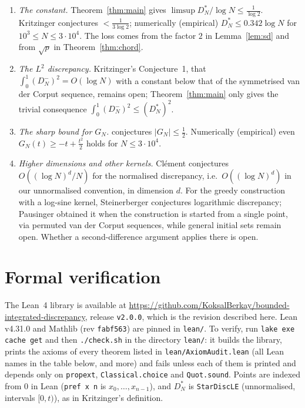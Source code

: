 \documentclass[11pt]{amsart}
\theoremstyle{remark}
\begin{document}
\begin{enumerate}
\item \emph{The constant.} Theorem~\ref{thm:main} gives
$\limsup D_N^*/\log N\le\frac1{\log2}$. Kritzinger conjectures
$<\frac1{3\log2}$; numerically (empirical) $D_N^*\le0.342\log N$ for
$10^3\le N\le3\cdot10^4$. The loss comes from the factor $2$ in Lemma~\ref{lem:sd}
and from $\sqrt p$ in Theorem~\ref{thm:chord}.
\item \emph{The $L^2$ discrepancy.} Kritzinger's Conjecture~1, that
$\int_0^1(D_N^-)^2=O(\log N)$ with a constant below that of the symmetrised van der
Corput sequence, remains open; Theorem~\ref{thm:main} only gives the trivial
consequence $\int_0^1(D_N^-)^2\le(D_N^*)^2$.
\item \emph{The sharp bound for $G_N$.} \cite{Den} conjectures
$|G_N|\le\frac12$. Numerically (empirical) even $G_N(t)\ge-t+\frac{t^2}2$ holds for
$N\le3\cdot10^4$.
\item \emph{Higher dimensions and other kernels.} Clément \cite{Cle} conjectures
$O((\log N)^d/N)$ for the normalised discrepancy, i.e.\ $O((\log N)^d)$ in our
unnormalised convention, in dimension $d$. For the greedy construction with a
log-sine kernel, Steinerberger \cite{Ste19} conjectures logarithmic discrepancy;
Pausinger \cite{Pau} obtained it when the construction is started from a single
point, via permuted van der Corput sequences, while general initial sets remain open.
Whether a second-difference argument applies there is open.
\end{enumerate}

\section{Formal verification}\label{sec:lean}

The Lean~4 library is available at
\url{https://github.com/KoksalBerkay/bounded-integrated-discrepancy}, release
\texttt{v2.0.0}, which is the revision described here. Lean v4.31.0 and Mathlib
(rev \texttt{fabf563}) are pinned in \texttt{lean/}. To verify, run
\texttt{lake exe cache get} and then \texttt{./check.sh} in the directory
\texttt{lean/}: it builds the library, prints the axioms of every theorem listed in
\texttt{lean/AxiomAudit.lean} (all Lean names in the table below, and more) and
fails unless each of them is printed and depends only on \texttt{propext},
\texttt{Classical.choice} and \texttt{Quot.sound}.
Points are indexed from $0$ in Lean (\texttt{pref x n} is $x_0,\dots,x_{n-1}$), and
$D_N^*$ is \texttt{StarDiscLE} (unnormalised, intervals $[0,t)$), as in
Kritzinger's definition.
\end{document}
